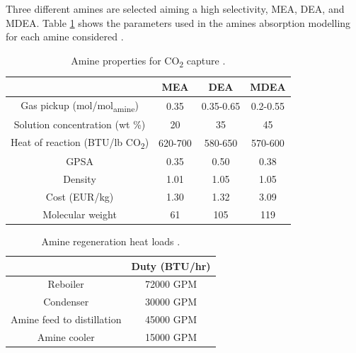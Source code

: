 \begin{refsection}[referencesCh7]
Three different amines are selected aiming a high selectivity, MEA, DEA, and MDEA. Table \ref{table:ChETable2} shows the parameters used in the amines absorption modelling for each amine considered \citep{2012gpsa, 2004gpsa}.

\begin{table}[h]
	\centering
	\caption{Amine properties for CO\textsubscript{2} capture \protect\citet{2012gpsa, 2004gpsa}.}
	\label{table:ChETable2}
		\begin{tabular}{@{}cccc@{}}
			\toprule
			& MEA     & DEA       & MDEA     \\ \midrule
			Gas pickup (mol/mol\textsubscript{amine})       & 0.35    & 0.35-0.65 & 0.2-0.55 \\
			Solution concentration (wt \%) & 20      & 35        & 45       \\
			Heat of reaction (BTU/lb CO\textsubscript{2})  & 620-700 & 580-650   & 570-600  \\
			GPSA                           & 0.35    & 0.50      & 0.38     \\
			Density                        & 1.01    & 1.05      & 1.05     \\
			Cost (EUR/kg)                  & 1.30    & 1.32      & 3.09     \\
			Molecular weight               & 61      & 105       & 119      \\ \bottomrule
		\end{tabular}
\end{table}

\begin{table}[h]
	\centering
	\caption{Amine regeneration heat loads \protect\citet{2004gpsa}.}
	\label{table:ChETable3}
	\begin{tabular}{@{}cc@{}}
		\toprule
		& Duty (BTU/hr) \\ \midrule
		Reboiler                   & 72000 GPM     \\
		Condenser                  & 30000 GPM     \\
		Amine feed to distillation & 45000 GPM     \\
		Amine cooler               & 15000 GPM     \\ \bottomrule
	\end{tabular}
\end{table}


\end{refsection}
